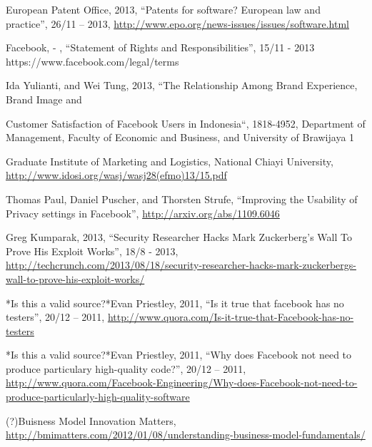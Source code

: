 \documentclass[conference]{IEEEtran}
\begin{document}
\begin{thebibliography}{1}
European Patent Office, 2013, “Patents for software? European law and
practice”, 26/11 – 2013, \href{http://www.epo.org/news-issues/issues/software.html}{http://www.epo.org/news-issues/issues/software.html}

Facebook, - , “Statement of Rights and Responsibilities”, 15/11 - 2013
https://www.facebook.com/legal/terms

Ida Yulianti, and Wei Tung, 2013, “The Relationship Among Brand Experience,
Brand Image and

Customer Satisfaction of Facebook Users in Indonesia“, 1818-4952, Department of
Management, Faculty of Economic and Business, and University of Brawijaya 1

Graduate Institute of Marketing and Logistics, National Chiayi University,
\href{http://www.idosi.org/wasj/wasj28(efmo)13/15.pdf}{http://www.idosi.org/wasj/wasj28(efmo)13/15.pdf }

Thomas Paul, Daniel Puscher, and Thorsten Strufe, “Improving the Usability of
Privacy settings in Facebook”, \href{http://arxiv.org/abs/1109.6046}{http://arxiv.org/abs/1109.6046 }

Greg Kumparak, 2013, “Security Researcher Hacks Mark Zuckerberg’s Wall To Prove
His Exploit Works”, 18/8 - 2013,
\href{http://techcrunch.com/2013/08/18/security-researcher-hacks-mark-zuckerbergs-wall-to-prove-his-exploit-works/}{http://techcrunch.com/2013/08/18/security-researcher-hacks-mark-zuckerbergs-wall-to-prove-his-exploit-works/}

*Is this a valid source?*Evan Priestley, 2011, “Is it true that facebook has no
testers”, 20/12 – 2011,
\href{http://www.quora.com/Is-it-true-that-Facebook-has-no-testers}{http://www.quora.com/Is-it-true-that-Facebook-has-no-testers}

*Is this a valid source?*Evan Priestley, 2011, “Why does Facebook not need to
produce particulary high-quality code?”, 20/12 – 2011,
\href{http://www.quora.com/Facebook-Engineering/Why-does-Facebook-not-need-to-produce-particularly-high-quality-software}{http://www.quora.com/Facebook-Engineering/Why-does-Facebook-not-need-to-produce-particularly-high-quality-software}

(?)Buisness Model Innovation Matters,
\href{http://bmimatters.com/2012/01/08/understanding-business-model-fundamentals/}{http://bmimatters.com/2012/01/08/understanding-business-model-fundamentals/}


\end{thebibliography}
\end{document}
